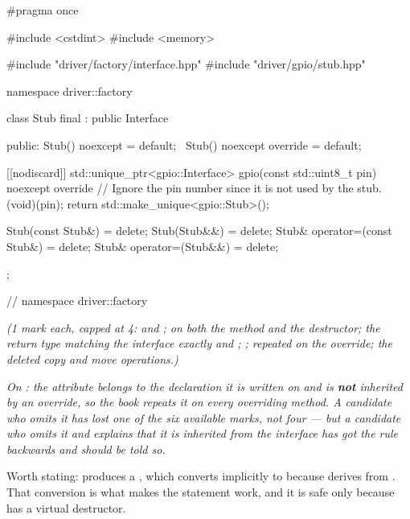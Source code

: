 \begin{cppcode}
#pragma once

#include <cstdint>
#include <memory>

#include "driver/factory/interface.hpp"
#include "driver/gpio/stub.hpp"

namespace driver::factory
{
class Stub final : public Interface
{
public:
    Stub() noexcept           = default;
    ~Stub() noexcept override = default;

    [[nodiscard]] std::unique_ptr<gpio::Interface> gpio(const std::uint8_t pin) noexcept override
    {
        // Ignore the pin number since it is not used by the stub.
        (void)(pin);
        return std::make_unique<gpio::Stub>();
    }

    Stub(const Stub&)            = delete;
    Stub(Stub&&)                 = delete;
    Stub& operator=(const Stub&) = delete;
    Stub& operator=(Stub&&)      = delete;
};
} // namespace driver::factory
\end{cppcode}

{\itshape (1 mark each, capped at 4:  and ; 
on both the method and the destructor; the return type matching the interface exactly and
; ; \code{[[nodiscard]]} repeated on the override; the
deleted copy and move operations.)\par}

\medskip
{\itshape On \code{[[nodiscard]]}: the attribute belongs to the declaration it is written on and is
\textbf{not} inherited by an override, so the book repeats it on every overriding method. A
candidate who omits it has lost one of the six available marks, not four --- but a candidate who
omits it and explains that it is inherited from the interface has got the rule backwards and should
be told so.\par}

\medskip
Worth stating:  produces a
, which converts implicitly to
 because  derives from . That
conversion is what makes the  statement work, and it is safe only because
 has a virtual destructor.


